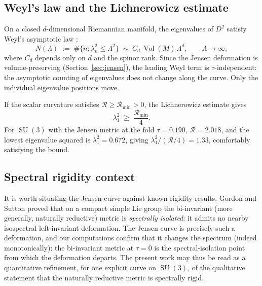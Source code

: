 \documentclass[12pt]{article}
\theoremstyle{definition}
\theoremstyle{remark}
\DeclareMathOperator{\Vol}{Vol}
\DeclareMathOperator{\SU}{SU}
\begin{document}
\subsection{Weyl's law and the Lichnerowicz estimate}

On a closed $d$-dimensional Riemannian manifold, the eigenvalues of
$D^2$ satisfy Weyl's asymptotic law
\cite{Ivrii2019}:
\begin{equation}\label{eq:weyl-law}
  N(\Lambda) \;:=\; \#\{n : \lambda_n^2 \leq \Lambda^2\}
  \;\sim\; C_d\, \Vol(M)\, \Lambda^d, \qquad \Lambda\to\infty,
\end{equation}
where $C_d$ depends only on $d$ and the spinor rank.  Since the Jensen
deformation is volume-preserving (Section~\ref{sec:jensen}), the
leading Weyl term is $\tau$-independent: the asymptotic counting of
eigenvalues does not change along the curve.  Only the individual
eigenvalue positions move.

If the scalar curvature satisfies $\mathcal{R} \geq \mathcal{R}_{\min} > 0$,
the Lichnerowicz estimate \cite{Lichnerowicz1958} gives
\begin{equation}\label{eq:lichnerowicz}
  \lambda_1^2 \;\geq\; \frac{\mathcal{R}_{\min}}{4}.
\end{equation}
For $\SU(3)$ with the Jensen metric at the fold $\tau = 0.190$,
$\mathcal{R} = 2.018$, and the lowest eigenvalue squared is
$\lambda_1^2 = 0.672$, giving $\lambda_1^2/(\mathcal{R}/4) = 1.33$,
comfortably satisfying the bound.

\subsection{Spectral rigidity context}
\label{subsec:rigidity}

It is worth situating the Jensen curve against known rigidity results.
Gordon and Sutton \cite{GordonSutton2010} proved that on a compact
simple Lie group the bi-invariant (more generally, naturally reductive)
metric is \emph{spectrally isolated}: it admits no nearby isospectral
left-invariant deformation.  The Jensen curve is precisely such a
deformation, and our computations confirm that it changes the spectrum
(indeed monotonically): the bi-invariant metric at $\tau=0$ is the
spectral-isolation point from which the deformation departs.  The
present work may thus be read as a quantitative refinement, for one
explicit curve on $\SU(3)$, of the qualitative statement that the
naturally reductive metric is spectrally rigid.


\end{document}
